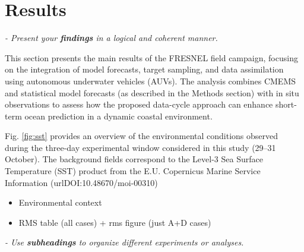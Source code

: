 \section{Results}
\textit{- Present your \textbf{findings} in a logical and coherent manner.}

This section presents the main results of the FRESNEL field campaign,
focusing on the integration of model forecasts, target sampling, and
data assimilation using autonomous underwater vehicles (AUVs). The
analysis combines CMEMS and statistical model forecasts (as described
in the Methods section) with in situ observations to assess how the
proposed data-cycle approach can enhance short-term ocean prediction
in a dynamic coastal environment.

Fig. \ref{fig:sst} provides an overview of the environmental
conditions observed during the three-day experimental window
considered in this study (29–31 October). The background fields
correspond to the Level-3 Sea Surface Temperature (SST) product from
the E.U. Copernicus Marine Service Information
(url{DOI:10.48670/moi-00310})


\begin{figure}
  \centering {}
\end{figure}

\begin{itemize}
    \item Environmental context
    
 
    \item RMS table (all cases) + rms figure (just A+D cases)
\end{itemize}

 
\textit{- Use \textbf{subheadings} to organize different experiments or analyses.}
